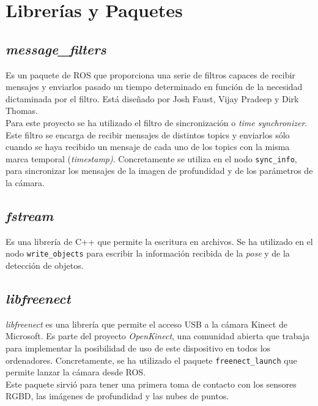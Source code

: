 \section{Librerías y Paquetes}

\subsection{\textit{message\_filters}}

Es un paquete de ROS que proporciona una serie de filtros capaces de recibir mensajes y enviarlos pasado un tiempo determinado en función de la necesidad dictaminada por el filtro. Está diseñado por Josh Faust, Vijay Pradeep y Dirk Thomas. \cite{message_filters}\\

Para este proyecto se ha utilizado el filtro de sincronización o \textit{time synchronizer}. Este filtro se encarga de recibir mensajes de distintos topics y enviarlos sólo cuando se haya recibido un mensaje de cada uno de los topics con la misma marca temporal (\textit{timestamp)}. Concretamente se utiliza en el nodo \texttt{sync\_info}, para sincronizar los mensajes de la imagen de profundidad y de los parámetros de la cámara. \\ 

\subsection{\textit{fstream}}

Es una librería de C++ que permite la escritura en archivos. Se ha utilizado en el nodo \texttt{write\_objects} para escribir la información recibida de la \textit{pose} y de la detección de objetos. \cite{fstream}\\

\subsection{\textit{libfreenect}}

\textit{libfreenect} es una librería que permite el acceso USB a la cámara Kinect de Microsoft. Es parte del proyecto \textit{OpenKinect}, una comunidad abierta que trabaja para implementar la posibilidad de uso de este dispositivo en todos los ordenadores. Concretamente, se ha utilizado el paquete \texttt{freenect\_launch} que permite lanzar la cámara desde ROS. \cite{libfreenect}\\

Este paquete sirvió para tener una primera toma de contacto con los sensores RGBD, las imágenes de profundidad y las nubes de puntos.\\

